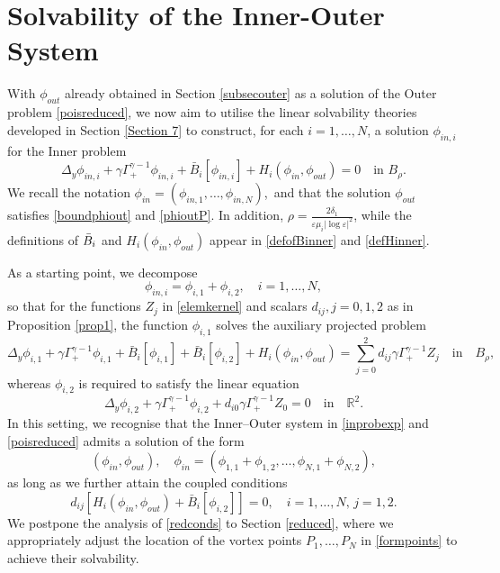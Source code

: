 \documentclass[11pt,reqno,a4paper]{amsart}
\numberwithin{equation}{section}
\newcommand{\R}{\mathbb{R}}
\newcommand{\ve}{\varepsilon}
\begin{document}
\section{Solvability of the Inner-Outer System}\label{Section projected}
With $\phi_{out}$ already obtained in Section \ref{subsecouter} as a solution of the Outer problem \eqref{poisreduced}, we now aim to utilise the linear solvability theories developed in Section \ref{Section 7} to construct, for each $i=1,\dots,N$, a solution $\phi_{in,i}$ for the Inner problem
\[\Delta_{y}\phi_{in,i}+\gamma\Gamma^{\gamma-1}_{+}\phi_{in,i}+\bar{B}_i[\phi_{in,i}]
+H_i\left(\phi_{in},\phi_{out}\right) = 0 \quad \mbox{in} \,\, B_{\rho}.\]
We recall the notation $\phi_{in}=\left(\phi_{in,1},\dots,\phi_{in,N}\right)$,\, and that the solution $\phi_{out}$ satisfies \eqref{boundphiout} and \eqref{phioutP}. In addition,  $\rho=\frac{2\delta_1}{\ve\mu_i|\log\ve|^2}$, while the definitions of $\Bar{B}_i$ and $H_i(\phi_{in},\phi_{out})$ appear in \eqref{defofBinner} and \eqref{defHinner}.

As a starting point, we decompose \[\phi_{in,i}=\phi_{i,1}+\phi_{i,2},\quad i=1,\dots,N,\] so that for the functions $Z_j$ in \eqref{elemkernel} and scalars $d_{ij}, j=0,1,2$ as in Proposition \ref{prop1}, the function $\phi_{i,1}$ solves the auxiliary projected problem
\begin{equation}\label{problemforphi1}
\Delta_{y}\phi_{i,1}+\gamma\Gamma^{\gamma-1}_{+}\phi_{i,1}+\bar{B}_i[\phi_{i,1}]+\bar{B}_i[\phi_{i,2}]+H_i(\phi_{in},\phi_{out})=\sum_{j=0}^{2}d_{ij}\gamma\Gamma^{\gamma-1}_{+}Z_j \quad \mbox{in} \quad B_{\rho},
\end{equation}
whereas $\phi_{i,2}$ is required to satisfy the linear equation 
\begin{equation}\label{problemforphi2}
\Delta_{y}\phi_{i,2}+\gamma\Gamma^{\gamma-1}_{+}\phi_{i,2} +d_{i0}\gamma\Gamma^{\gamma-1}_{+}Z_0=0 \quad \mbox{in}\quad\R^2.
\end{equation}
In this setting, we recognise that the Inner–Outer system in \eqref{inprobexp} and \eqref{poisreduced} admits a solution of the form \[(\phi_{in},\phi_{out}), \quad \phi_{in}=\left(\phi_{1,1}+\phi_{1,2},\dots,\phi_{N,1}+\phi_{N,2}\right),\] as long as we further attain the coupled conditions 
\begin{equation}\label{redconds}d_{ij}\left[H_i(\phi_{in},\phi_{out})+\bar{B}_i[\phi_{i,2}]\right]=0, \quad i=1,\dots,N, \, j=1,2.
\end{equation}
We postpone the analysis of \eqref{redconds} to Section \ref{reduced}, where we appropriately adjust the location of the vortex points $P_1,\dots,P_N$ in \eqref{formpoints} to achieve their solvability.
\end{document}
